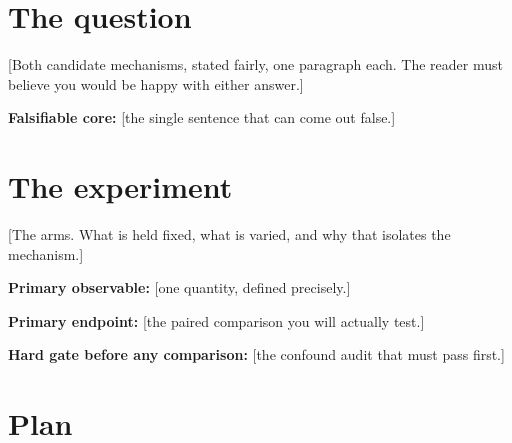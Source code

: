 \documentclass[10pt]{article}
\newcommand{\lead}[1]{{\sffamily\bfseries #1}}
\newcommand{\badge}[2]{%
  \tikz[baseline=(b.base)]{\node[fill=#1!12,text=#1!80!black,rounded corners=2pt,
    inner xsep=3.5pt,inner ysep=1.3pt,font=\sffamily\bfseries\scriptsize] (b) {#2};}}
\begin{document}
\section{The question}

[Both candidate mechanisms, stated fairly, one paragraph each. The reader must
believe you would be happy with either answer.]

\begin{keybox}
\lead{Falsifiable core:} [the single sentence that can come out false.]
\end{keybox}

\section{The experiment}

[The arms. What is held fixed, what is varied, and why that isolates the
mechanism.]

\lead{Primary observable:} [one quantity, defined precisely.]

\lead{Primary endpoint:} [the paired comparison you will actually test.]

\lead{Hard gate before any comparison:} [the confound audit that must pass
first.]

\section{Plan}

\begin{center}
\end{center}
\end{document}
